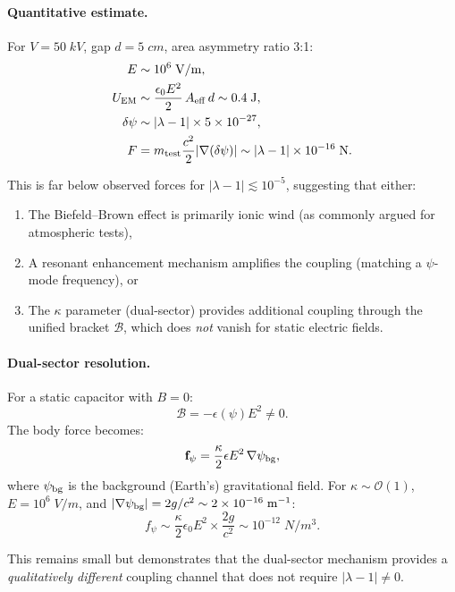\documentclass[aps,prd,twocolumn,superscriptaddress,floatfix,nofootinbib]{revtex4-2}
\newcommand{\lam}{\lambda}
\begin{document}
\paragraph{Quantitative estimate.}
For $V = 50\;\si{kV}$, gap $d = 5\;\si{cm}$, area asymmetry ratio 3:1:
\begin{align}
E &\sim 10^6\;\si{V/m},\\
U_{\rm EM} &\sim \frac{\epsilon_0 E^2}{2}\,A_{\rm eff}\,d
\sim 0.4\;\si{J},\\
\delta\psi &\sim |\lam-1| \times 5 \times 10^{-27},\\
F &= m_{\rm test}\frac{c^2}{2}|\nabla(\delta\psi)|
\sim |\lam-1| \times 10^{-16}\;\si{N}.
\end{align}

This is far below observed forces for $|\lam-1| \lesssim 10^{-5}$,
suggesting that either:
\begin{enumerate}[nosep]
\item The Biefeld--Brown effect is primarily ionic wind (as commonly
argued for atmospheric tests),
\item A resonant enhancement mechanism amplifies the coupling
(matching a $\psi$-mode frequency), or
\item The $\kappa$ parameter (dual-sector) provides additional
coupling through the unified bracket $\mathcal{B}$, which does
\emph{not} vanish for static electric fields.
\end{enumerate}

\paragraph{Dual-sector resolution.}
For a static capacitor with $B = 0$:
\begin{equation}
\mathcal{B} = -\epsilon(\psi)E^2 \neq 0.
\end{equation}
The body force becomes:
\begin{equation}
\mathbf{f}_\psi = \frac{\kappa}{2}\epsilon E^2\,\nabla\psi_{\rm bg},
\end{equation}
where $\psi_{\rm bg}$ is the background (Earth's) gravitational field.
For $\kappa \sim \mathcal{O}(1)$, $E = 10^6\;\si{V/m}$, and
$|\nabla\psi_{\rm bg}| = 2g/c^2 \sim 2 \times 10^{-16}\;\si{m^{-1}}$:
\begin{equation}
f_\psi \sim \frac{\kappa}{2}\epsilon_0 E^2 \times \frac{2g}{c^2}
\sim 10^{-12}\;\si{N/m^3}.
\end{equation}

This remains small but demonstrates that the dual-sector mechanism
provides a \emph{qualitatively different} coupling channel that does
not require $|\lam-1| \neq 0$.
\end{document}
